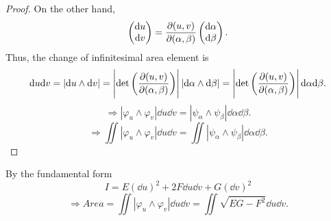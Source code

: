 \begin{enumerate}[(1)]
\begin{proof}
    On the other hand,
    \[
        \begin{pmatrix}
            \dd u\\ \dd v
        \end{pmatrix}
        =\pdv{(u,v)}{(\alpha,\beta)}\begin{pmatrix}
            \dd \alpha\\
            \dd \beta
        \end{pmatrix} .
    \]
    Thus, the change of infinitesimal area element is
    \[
        \dd u\dd v=\left|\dd u\wedge\dd v\right|=
        \left|\det \left(\pdv{(u,v)}{(\alpha,\beta)}\right)\right|
        \left|\dd\alpha\wedge\dd\beta\right|=
        \left|\det \left(\pdv{(u,v)}{(\alpha,\beta)}\right)\right|
        \dd\alpha\dd\beta.
    \]
    \[\Rightarrow \left|\varphi_u\wedge \varphi_v \right|
        \dd u\dd v=\left|\psi_\alpha\wedge\psi_\beta\right|\dd \alpha
        \dd \beta.
    \]
    \[\Rightarrow \iint \left|\varphi_u\wedge \varphi_v \right|
    \dd u\dd v=\iint \left|\psi_\alpha\wedge\psi_\beta\right|\dd \alpha
    \dd \beta.\]
\end{proof}
\begin{remark}
    By the  fundamental form 
    \[
        I=E(\dd u)^2+2F \dd u\dd v+G(\dd v)^2    
    \]
    \[\Rightarrow Area=\iint \left|\varphi_u\wedge \varphi_v \right|
    \dd u\dd v=\iint \sqrt{EG-F^2}\dd u\dd v.\]
\end{remark}
\end{enumerate}
